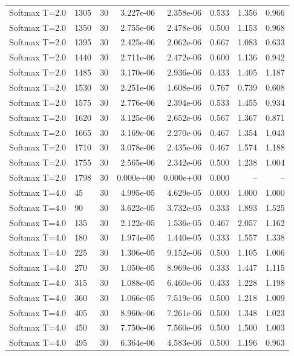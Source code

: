 \begin{scriptsize}
\begin{longtable}{llrrrrrr}
Softmax T=2.0 & 1305 & 30 & 3.227e-06 & 2.358e-06 & 0.533 & 1.356 & 0.966 \\
Softmax T=2.0 & 1350 & 30 & 2.755e-06 & 2.478e-06 & 0.500 & 1.153 & 0.968 \\
Softmax T=2.0 & 1395 & 30 & 2.425e-06 & 2.062e-06 & 0.667 & 1.083 & 0.633 \\
Softmax T=2.0 & 1440 & 30 & 2.711e-06 & 2.472e-06 & 0.600 & 1.136 & 0.942 \\
Softmax T=2.0 & 1485 & 30 & 3.170e-06 & 2.936e-06 & 0.433 & 1.405 & 1.187 \\
Softmax T=2.0 & 1530 & 30 & 2.251e-06 & 1.608e-06 & 0.767 & 0.739 & 0.608 \\
Softmax T=2.0 & 1575 & 30 & 2.776e-06 & 2.394e-06 & 0.533 & 1.455 & 0.934 \\
Softmax T=2.0 & 1620 & 30 & 3.125e-06 & 2.652e-06 & 0.567 & 1.367 & 0.871 \\
Softmax T=2.0 & 1665 & 30 & 3.169e-06 & 2.270e-06 & 0.467 & 1.354 & 1.043 \\
Softmax T=2.0 & 1710 & 30 & 3.078e-06 & 2.435e-06 & 0.467 & 1.574 & 1.188 \\
Softmax T=2.0 & 1755 & 30 & 2.565e-06 & 2.342e-06 & 0.500 & 1.238 & 1.004 \\
Softmax T=2.0 & 1798 & 30 & 0.000e+00 & 0.000e+00 & 0.000 & -- & -- \\
Softmax T=4.0 & 45 & 30 & 4.995e-05 & 4.629e-05 & 0.000 & 1.000 & 1.000 \\
Softmax T=4.0 & 90 & 30 & 3.622e-05 & 3.732e-05 & 0.333 & 1.893 & 1.525 \\
Softmax T=4.0 & 135 & 30 & 2.122e-05 & 1.536e-05 & 0.467 & 2.057 & 1.162 \\
Softmax T=4.0 & 180 & 30 & 1.974e-05 & 1.440e-05 & 0.333 & 1.557 & 1.338 \\
Softmax T=4.0 & 225 & 30 & 1.306e-05 & 9.152e-06 & 0.500 & 1.105 & 1.006 \\
Softmax T=4.0 & 270 & 30 & 1.050e-05 & 8.969e-06 & 0.333 & 1.447 & 1.115 \\
Softmax T=4.0 & 315 & 30 & 1.088e-05 & 6.460e-06 & 0.433 & 1.228 & 1.198 \\
Softmax T=4.0 & 360 & 30 & 1.066e-05 & 7.519e-06 & 0.500 & 1.218 & 1.009 \\
Softmax T=4.0 & 405 & 30 & 8.960e-06 & 7.261e-06 & 0.500 & 1.348 & 1.023 \\
Softmax T=4.0 & 450 & 30 & 7.750e-06 & 7.560e-06 & 0.500 & 1.500 & 1.003 \\
Softmax T=4.0 & 495 & 30 & 6.364e-06 & 4.583e-06 & 0.500 & 1.196 & 0.963 \\

\end{longtable}
\end{scriptsize}
